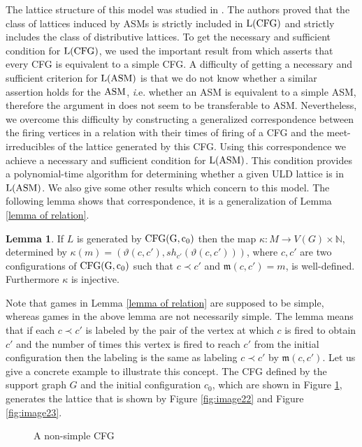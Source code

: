 \documentclass{article}
\theoremstyle{definition}
\newtheorem{lem}{Lemma}
\newcommand\meetirrdiff[2]{\mathfrak{m}(#1,#2)}
\newcommand\shotvector[2]{sh_{#1}(#2)}
\begin{document}
The lattice structure of this model was studied in \cite{Mag03}. The authors proved that the class of lattices induced by ASMs is strictly included in ${\rm L(CFG)}$ and strictly includes the class of distributive lattices. To get the necessary and sufficient condition for ${\rm L(CFG)}$, we used the important result from \cite{MVP01} which asserts that every CFG is equivalent to a simple CFG.  A difficulty of getting a necessary and sufficient criterion for ${\rm L(ASM)}$ is that we do not know whether a similar assertion holds for the ${\rm ASM}$, {\emph i.e.} whether an ASM is equivalent to a simple ASM, therefore the argument in \cite{MVP01} does not seem to be transferable to ASM. Nevertheless, we overcome this difficulty by constructing a generalized correspondence between the firing vertices in a relation with their times of firing of a CFG  and the meet-irreducibles of the lattice generated by this CFG. Using this correspondence we achieve a necessary and sufficient condition for ${\rm L(ASM)}$. This condition provides a polynomial-time algorithm for determining whether a given ULD lattice is in ${\rm L(ASM)}$. We also give some other results which concern to this model. The following lemma shows that correspondence, it is a generalization of Lemma \ref{lemma of relation}.
\begin{lem}
\label{generalization of lemma of relation}
If $L$ is generated by ${\rm CFG(G,c_0)}$ then the map $\kappa: M \to V(G)\times \mathbb{N}$, determined by $\kappa(m)=(\vartheta(c,c'),\shotvector{c'}{\vartheta(c,c')})$, where $c,c'$ are two configurations of ${\rm CFG(G,c_0)}$ such that $c\prec c'$ and $\meetirrdiff{c}{c'}=m$, is well-defined. Furthermore $\kappa$ is injective.  
\end{lem}
Note that games in Lemma \ref{lemma of relation} are supposed to be simple, whereas games in the above lemma are not necessarily simple. The lemma means that if each $c\prec c'$ is labeled by the pair of the vertex at which $c$ is fired to obtain $c'$ and the number of times this vertex is fired to reach $c'$ from the initial configuration then the labeling is the same as  labeling $c \prec c'$ by $\mathfrak{m}(c,c')$. Let us give a concrete example to illustrate this concept. The CFG defined by the support graph $G$ and the initial configuration $c_0$, which are shown in Figure \ref{fig:image4546}, generates the lattice that is shown by Figure \ref{fig:image22} and Figure \ref{fig:image23}.
\begin{figure}[!h]
\centering
{}
\qquad \qquad
{}
\caption{A non-simple CFG}
\label{fig:image4546}
\end{figure}
\end{document}
